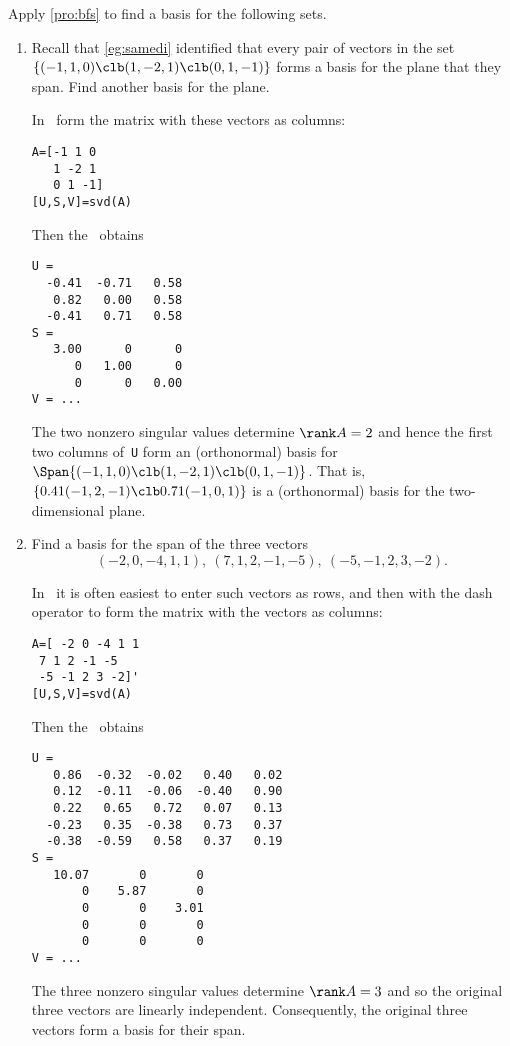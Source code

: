 \begin{example} 
Apply \cref{pro:bfs} to find a basis for the following sets.
\begin{enumerate}
\item Recall that \cref{eg:samedi} identified that every pair of vectors in the set \(\{(-1,1,0)\clb (1,-2,1)\clb (0,1,-1)\}\) forms a basis for the plane that they span.  
Find another basis for the plane.
\begin{solution} 
In \script\ form the matrix with these vectors as columns:
\begin{verbatim}
A=[-1 1 0
   1 -2 1
   0 1 -1]
[U,S,V]=svd(A)
\end{verbatim}
\setbox\ajrqrbox\hbox{}%
\marginajrbox%
Then the \svd\  obtains \twodp
\begin{verbatim}
U =
  -0.41  -0.71   0.58
   0.82   0.00   0.58
  -0.41   0.71   0.58
S =
   3.00      0      0
      0   1.00      0
      0      0   0.00
V = ...
\end{verbatim}
The two nonzero singular values determine \(\rank A=2\) and hence the first two columns of~\verb|U| form an (orthonormal) basis for \(\Span\{(-1,1,0)\clb (1,-2,1)\clb (0,1,-1)\}\).
That is, \(\{0.41(-1,2,-1)\clb 0.71(-1,0,1)\}\) is a (orthonormal) basis for the two-dimensional plane.
\end{solution}

\item Find a basis for the span of the three vectors
\begin{equation*}
(-2,0,-4,1,1),\ 
(7,1,2,-1,-5),\ 
(-5,-1,2,3,-2).
\end{equation*}
\begin{solution} 
In \script\ it is often easiest to enter such vectors as rows, and then  with the dash operator to form the matrix with the vectors as columns:
\begin{verbatim}
A=[ -2 0 -4 1 1
 7 1 2 -1 -5
 -5 -1 2 3 -2]'
[U,S,V]=svd(A)
\end{verbatim}
\setbox\ajrqrbox\hbox{}%
\marginajrbox%
Then the \svd\ obtains \twodp
\begin{verbatim}
U =
   0.86  -0.32  -0.02   0.40   0.02
   0.12  -0.11  -0.06  -0.40   0.90
   0.22   0.65   0.72   0.07   0.13
  -0.23   0.35  -0.38   0.73   0.37
  -0.38  -0.59   0.58   0.37   0.19
S =
   10.07       0       0
       0    5.87       0
       0       0    3.01
       0       0       0
       0       0       0
V = ...
\end{verbatim}
The three nonzero singular values determine  \(\rank A=3\) and so the original three vectors are linearly independent.
Consequently, the original three vectors form a basis for their span.


\end{solution}
\end{enumerate}
\end{example}
